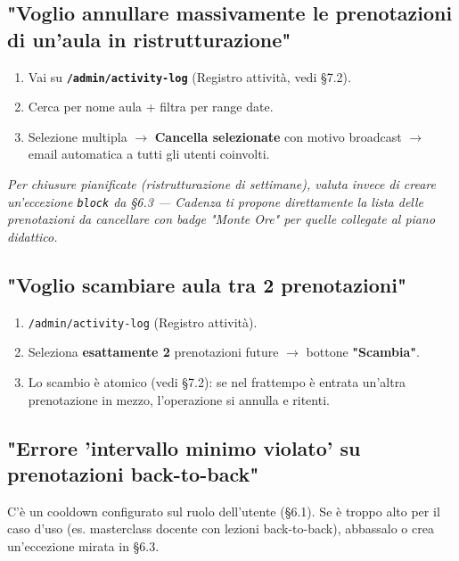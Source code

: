 \documentclass[11pt,a4paper]{article}
\renewenvironment{quote}
  {\begin{list}{}{%
      \setlength{\leftmargin}{8pt}%
      \setlength{\rightmargin}{8pt}%
      \setlength{\topsep}{6pt}%
      \setlength{\parsep}{0pt}}%
      \item\relax\color{black!75}\itshape}
  {\end{list}}
\begin{document}
\subsection{"Voglio annullare massivamente le prenotazioni di un'aula in ristrutturazione"}


\begin{enumerate}
  \item Vai su \textbf{\texttt{/admin/activity-log}} (Registro attività, vedi §7.2).
  \item Cerca per nome aula + filtra per range date.
  \item Selezione multipla $\rightarrow$ \textbf{Cancella selezionate} con motivo broadcast $\rightarrow$ email automatica a tutti gli utenti coinvolti.
\end{enumerate}

\begin{quote}
Per chiusure pianificate (ristrutturazione di settimane), valuta invece di creare un'eccezione \texttt{block} da §6.3 --- Cadenza ti propone direttamente la lista delle prenotazioni da cancellare con badge "Monte Ore" per quelle collegate al piano didattico.
\end{quote}

\subsection{"Voglio scambiare aula tra 2 prenotazioni"}


\begin{enumerate}
  \item \texttt{/admin/activity-log} (Registro attività).
  \item Seleziona \textbf{esattamente 2} prenotazioni future $\rightarrow$ bottone \textbf{"Scambia"}.
  \item Lo scambio è atomico (vedi §7.2): se nel frattempo è entrata un'altra prenotazione in mezzo, l'operazione si annulla e ritenti.
\end{enumerate}

\subsection{"Errore 'intervallo minimo violato' su prenotazioni back-to-back"}


C'è un cooldown configurato sul ruolo dell'utente (§6.1). Se è troppo alto per il caso d'uso (es. masterclass docente con lezioni back-to-back), abbassalo o crea un'eccezione mirata in §6.3.
\end{document}
